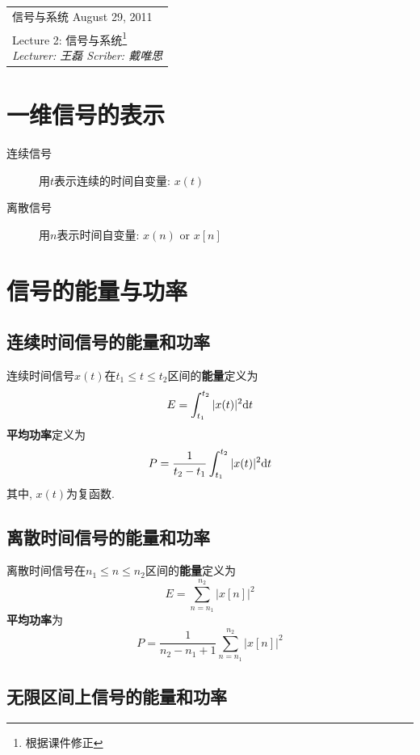 \def\lecture{2}
\clearpage \noindent\begin{tabularx}{\linewidth}{|X|}
\hline \vskip -2mm
{\sf 信号与系统} \hfill August 29, 2011 \\
{\centering \sf \large Lecture \lecture:
信号与系统\footnote{根据课件修正} \\ }
\textit{Lecturer: 王磊 \hfill Scriber: 戴唯思}\\ \hline
\end{tabularx}
\setcounter{section}{0}
\renewcommand{\thepage}{\lecture -\arabic{page}}


\section{一维信号的表示}

    \begin{description}
        \item[连续信号] 用$t$表示连续的时间自变量: $x(t)$
        \item[离散信号] 用$n$表示时间自变量: $x(n)$ or $x[n]$
    \end{description}

\section{信号的能量与功率}

    \subsection{连续时间信号的能量和功率}

    连续时间信号$x(t)$在$t_1\leqslant t\leqslant t_2$区间的\textbf{能量}定义为
    \[ E=\int_{t_1}^{t_2}|{x(t)}|^2\mathrm{d} t \]
    \textbf{平均功率}定义为
    \[ P=\frac{1}{t_2-t_1}\int_{t_1}^{t_2}|x(t)|^2\mathrm{d} t \]
    其中, $x(t)$为复函数.

    \subsection{离散时间信号的能量和功率}

    离散时间信号在$n_1\leqslant n\leqslant n_2$区间的\textbf{能量}定义为
    \[ E=\sum_{n=n_1}^{n_2}|x[n]|^2 \]
    \textbf{平均功率}为
    \[ P=\frac{1}{n_2-n_1+1}\sum_{n=n_1}^{n_2}|x[n]|^2 \]

    \subsection{无限区间上信号的能量和功率}


